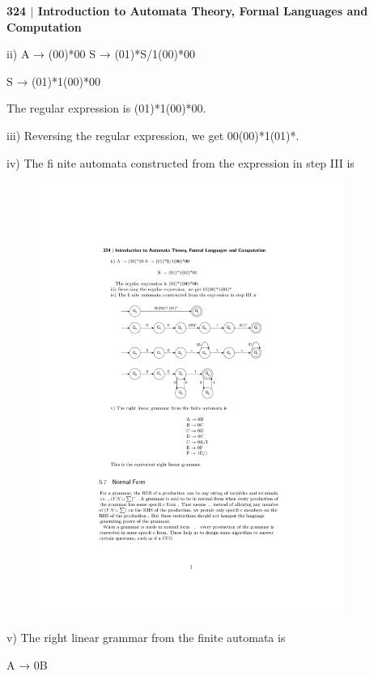 \documentclass[10pt,a4paper]{book}
\begin{document}
\small

\begin{flushleft}
  \textsf{\textbf{324 $|$ Introduction to Automata Theory, Formal Languages and Computation}}
\end{flushleft}

ii) A → (00)*00 S → (01)*S/1(00)*00

\quad

\qquad\qquad\qquad\qquad\qquad S → (01)*1(00)*00

\quad

\quad The regular expression is (01)*1(00)*00.

iii) Reversing the regular expression, we get 00(00)*1(01)*.

iv) The fi nite automata constructed from the expression in step III is

\begin{figure}[h]
  \centering
  \includegraphics[width=10cm]{324}\\
\end{figure}

v) The right linear grammar from the finite automata is

\quad

\qquad\qquad\qquad\qquad\qquad\qquad\qquad\qquad A → 0B
\end{document}
